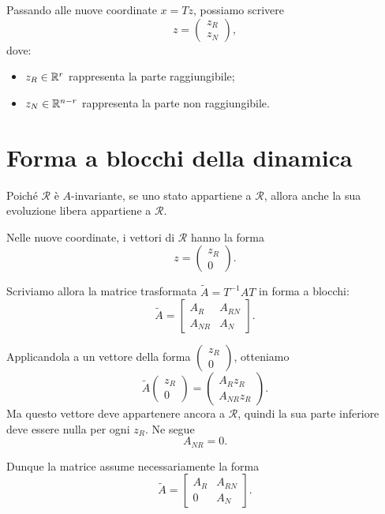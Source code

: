Passando alle nuove coordinate \(x=Tz\), possiamo scrivere
\[
z=
\begin{pmatrix}
z_R\\
z_N
\end{pmatrix},
\]
dove:
\begin{itemize}
    \item \(z_R\in\mathbb{R}^r\) rappresenta la parte raggiungibile;
    \item \(z_N\in\mathbb{R}^{n-r}\) rappresenta la parte non raggiungibile.
\end{itemize}

\section{Forma a blocchi della dinamica}

Poiché \(\mathcal{R}\) è \(A\)-invariante, se uno stato appartiene a \(\mathcal{R}\), allora anche la sua evoluzione libera appartiene a \(\mathcal{R}\).

Nelle nuove coordinate, i vettori di \(\mathcal{R}\) hanno la forma
\[
z=
\begin{pmatrix}
z_R\\
0
\end{pmatrix}.
\]

Scriviamo allora la matrice trasformata \(\tilde A=T^{-1}AT\) in forma a blocchi:
\begin{equation}
\tilde A=
\begin{bmatrix}
A_R & A_{RN}\\
A_{NR} & A_N
\end{bmatrix}.
\end{equation}

Applicandola a un vettore della forma \(\begin{pmatrix} z_R \\ 0 \end{pmatrix}\), otteniamo
\[
\tilde A
\begin{pmatrix}
z_R\\
0
\end{pmatrix}
=
\begin{pmatrix}
A_R z_R\\
A_{NR} z_R
\end{pmatrix}.
\]
Ma questo vettore deve appartenere ancora a \(\mathcal{R}\), quindi la sua parte inferiore deve essere nulla per ogni \(z_R\). Ne segue
\[
A_{NR}=0.
\]

Dunque la matrice assume necessariamente la forma
\begin{equation}
\tilde A=
\begin{bmatrix}
A_R & A_{RN}\\
0 & A_N
\end{bmatrix}.
\label{eq:L12_Atriangolare}
\end{equation}

